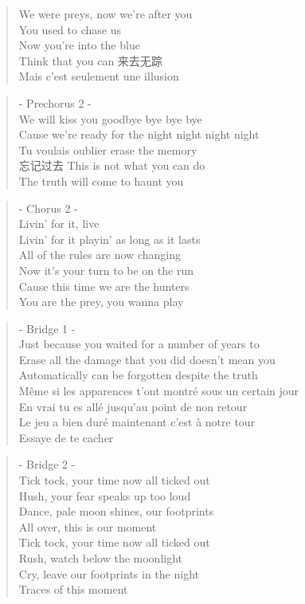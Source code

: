 \begin{verse}
We were preys, now we're after you\\
You used to chase us\\
Now you're into the blue\\
Think that you can 来去无踪 \\
Mais c'est seulement une illusion
\end{verse}

\begin{verse}
- Prechorus 2 -\\
We will kiss you goodbye bye bye bye\\
Cause we're ready for the night night night night\\
Tu voulais oublier erase the memory\\
忘记过去 This is not what you can do\\
The truth will come to haunt you
\end{verse}

\begin{verse}
- Chorus 2 -\\
Livin' for it, live \\
Livin' for it playin' as long as it lasts\\
All of the rules are now changing\\
Now it's your turn to be on the run\\
Cause this time we are the hunters \\
You are the prey, you wanna play
\end{verse}

\clearpage
{}

\begin{verse}
- Bridge 1 -\\
Just because you waited for a number of years to \\
Erase all the damage that you did doesn't mean you\\
Automatically can be forgotten despite the truth\\
Même si les apparences t'ont  montré sous un certain jour\\
En vrai tu es allé jusqu'au point de non retour \\
Le jeu a bien duré maintenant c'est à notre tour\\
Essaye de te cacher 
\end{verse}

\begin{verse}
- Bridge 2 -\\
Tick tock, your time now all ticked out\\
Hush, your fear speaks up too loud\\
Dance, pale moon shines, our footprints \\
All over, this is our moment\\ 
Tick tock, your time now all ticked out \\
Rush, watch below the moonlight \\
Cry, leave our footprints in the night \\
Traces of this moment
\end{verse}

